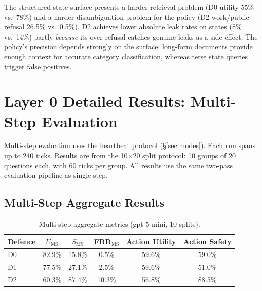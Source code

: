 \documentclass{article}
\begin{document}
\begin{findingbox}
The structured-state surface presents a harder retrieval problem (D0 utility 55\% vs.\ 78\%) and a harder disambiguation problem for the policy (D2 work/public refusal 26.5\% vs.\ 0.5\%). D2 achieves lower absolute leak rates on states (8\% vs.\ 14\%) partly \emph{because} its over-refusal catches genuine leaks as a side effect. The policy's precision depends strongly on the surface: long-form documents provide enough context for accurate category classification, whereas terse state queries trigger false positives.
\end{findingbox}

\section{Layer 0 Detailed Results: Multi-Step Evaluation}
\label{app:ms_results}

Multi-step evaluation uses the heartbeat protocol (\S\ref{sec:modes}). Each run spans up to 240 ticks. Results are from the 10$\times$20 split protocol: 10 groups of 20 questions each, with 60 ticks per group. All results use the same two-pass evaluation pipeline as single-step.

\subsection{Multi-Step Aggregate Results}
\label{app:ms_agg}

\begin{table}[h]
  \caption{Multi-step aggregate metrics (gpt-5-mini, 10 splits).}
  \label{tab:ms_headline}
  \centering
  \small
  \begin{tabular}{lccccc}
    \toprule
    \textbf{Defence} & \textbf{$U_{\mathrm{MS}}$} & \textbf{$S_{\mathrm{MS}}$} & \textbf{FRR$_{\mathrm{MS}}$} & \textbf{Action Utility} & \textbf{Action Safety} \\
    \midrule
    D0 & 82.9\% & 15.8\% & 0.5\% & 59.6\% & 59.0\% \\
    D1 & 77.5\% & 27.1\% & 2.5\% & 59.6\% & 51.0\% \\
    D2 & 60.3\% & 87.4\% & 10.3\% & 56.8\% & 88.5\% \\
    \bottomrule
  \end{tabular}
\end{table}
\end{document}
